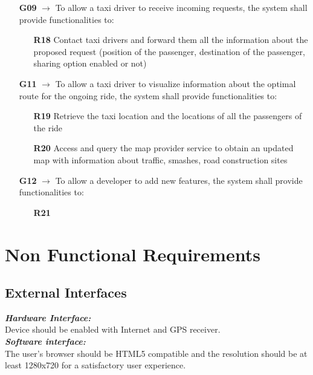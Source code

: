 \begin{itemize}
	\item [\textbf{G09}] $\rightarrow$ To allow a taxi driver to receive incoming requests, the system shall provide functionalities to:
	\begin{itemize}
		\item [\textbf{R18}] Contact taxi drivers and forward them all the information about the proposed request (position of the passenger, destination of the passenger, sharing option enabled or not)
	\end{itemize}		
	
	\item [\textbf{G11}] $\rightarrow$ To allow a taxi driver to visualize information about the optimal route for the ongoing ride, the system shall provide functionalities to:
	\begin{itemize}
		\item [\textbf{R19}] Retrieve the taxi location and the locations of all the passengers of the ride
		\item [\textbf{R20}] Access and query the map provider service to obtain an updated map with information about traffic, smashes, road construction sites
	\end{itemize}
	
	\item [\textbf{G12}] $\rightarrow$ To allow a developer to add new features, the system shall provide functionalities to:
	\begin{itemize}
		\item [\textbf{R21}] 
	\end{itemize}
\end{itemize}

\section{Non Functional Requirements}

\subsection{External Interfaces}
\textit{\textbf{Hardware Interface:}}\\
Device should be enabled with Internet and GPS receiver.\\
\textit{\textbf{Software interface:}}\\
The user's browser should be HTML5 compatible and the resolution should be at least 1280x720 for a satisfactory user experience.\\

